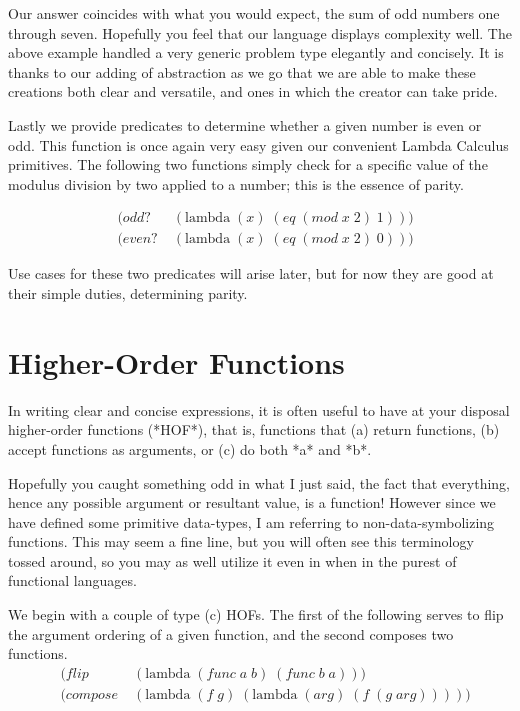 Our answer coincides with what you would expect, the sum of odd numbers one 
through seven. Hopefully you feel that our language displays complexity well. The 
above example handled a very generic problem type elegantly and concisely. It is 
thanks to our adding of abstraction as we go that we are able to make these 
creations both clear and versatile, and ones in which the creator can take pride.

Lastly we provide predicates to determine whether a given number is even or odd. 
This function is once again very easy given our convenient Lambda Calculus 
primitives. The following two functions simply check for a specific value of the 
modulus division by two applied to a number; this is the essence of parity.

\begin{align*}
& (odd? \; &(\text{lambda} \; (x) \; (eq \; (mod \; x \; 2) \; 1)))
\\& (even? \; &(\text{lambda} \; (x) \; (eq \; (mod \; x \; 2) \; 0)))
\end{align*}

Use cases for these two predicates will arise later, but for now they are good at 
their simple duties, determining parity.

\section{Higher-Order Functions}
In writing clear and concise expressions, it is often useful to have at your 
disposal higher-order functions (*HOF*), that is, functions that (a) return 
functions, (b) accept functions as arguments, or (c) do both *a* and *b*.

Hopefully you caught something odd in what I just said, the fact that everything, 
hence any possible argument or resultant value, is a function! However since we 
have defined some primitive data-types, I am referring to non-data-symbolizing 
functions. This may seem a fine line, but you will often see this terminology 
tossed around, so you may as well utilize it even in when in the purest of 
functional languages.

We begin with a couple of type (c) HOFs. The first of the following serves to flip 
the argument ordering of a given function, and the second composes two functions.
\begin{align*}
& (flip \; &(\text{lambda} \; (func \; a \; b) \; (func \; b \; a)))
\\& (compose \; &(\text{lambda} \; (f \; g) \; (\text{lambda} \; (arg) \; (f \; (g \; arg)))))
\end{align*}

